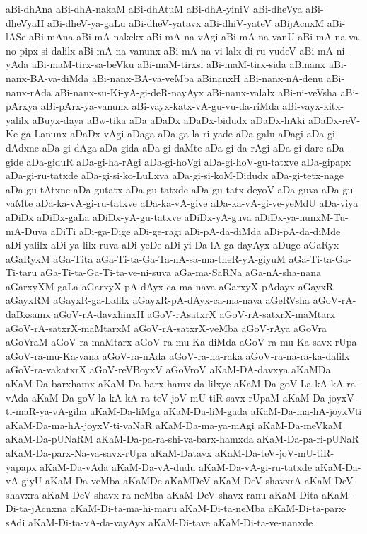 {aBi-dhAna
aBi-dhA-nakaM
aBi-dhAtuM
aBi-dhA-yiniV
aBi-dheVya
aBi-dheVyaH
aBi-dheV-ya-gaLu
aBi-dheV-yatavx
aBi-dhiV-yateV
aBijAcnxM
aBi-lASe
aBi-mAna
aBi-mA-nakekx
aBi-mA-na-vAgi
aBi-mA-na-vanU
aBi-mA-na-va-no-pipx-si-dalilx
aBi-mA-na-vanunx
aBi-mA-na-vi-lalx-di-ru-vudeV
aBi-mA-ni-yAda
aBi-maM-tirx-sa-beVku
aBi-maM-tirxsi
aBi-maM-tirx-sida
aBinanx
aBi-nanx-BA-va-diMda
aBi-nanx-BA-va-veMba
aBinanxH
aBi-nanx-nA-denu
aBi-nanx-rAda
aBi-nanx-su-Ki-yA-gi-deR-nayAyx
aBi-nanx-valalx
aBi-ni-veVsha
aBi-pArxya
aBi-pArx-ya-vanunx
aBi-vayx-katx-vA-gu-vu-da-riMda
aBi-vayx-kitx-yalilx
aBuyx-daya
aBw-tika
aDa
aDaDx
aDaDx-bidudx
aDaDx-hAki
aDaDx-reV-Ke-ga-Lanunx
aDaDx-vAgi
aDaga
aDa-ga-la-ri-yade
aDa-galu
aDagi
aDa-gi-dAdxne
aDa-gi-dAga
aDa-gida
aDa-gi-daMte
aDa-gi-da-rAgi
aDa-gi-dare
aDa-gide
aDa-giduR
aDa-gi-ha-rAgi
aDa-gi-hoVgi
aDa-gi-hoV-gu-tatxve
aDa-gipapx
aDa-gi-ru-tatxde
aDa-gi-si-ko-LuLxva
aDa-gi-si-koM-Didudx
aDa-gi-tetx-nage
aDa-gu-tAtxne
aDa-gutatx
aDa-gu-tatxde
aDa-gu-tatx-deyoV
aDa-guva
aDa-gu-vaMte
aDa-ka-vA-gi-ru-tatxve
aDa-ka-vA-give
aDa-ka-vA-gi-ve-yeMdU
aDa-viya
aDiDx
aDiDx-gaLa
aDiDx-yA-gu-tatxve
aDiDx-yA-guva
aDiDx-ya-nunxM-Tu-mA-Duva
aDiTi
aDi-ga-Dige
aDi-ge-ragi
aDi-pA-da-diMda
aDi-pA-da-diMde
aDi-yalilx
aDi-ya-lilx-ruva
aDi-yeDe
aDi-yi-Da-lA-ga-dayAyx
aDuge
aGaRyx
aGaRyxM
aGa-Tita
aGa-Ti-ta-Ga-Ta-nA-sa-ma-theR-yA-giyuM
aGa-Ti-ta-Ga-Ti-taru
aGa-Ti-ta-Ga-Ti-ta-ve-ni-suva
aGa-ma-SaRNa
aGa-nA-sha-nana
aGarxyXM-gaLa
aGarxyX-pA-dAyx-ca-ma-nava
aGarxyX-pAdayx
aGayxR
aGayxRM
aGayxR-ga-Lalilx
aGayxR-pA-dAyx-ca-ma-nava
aGeRVsha
aGoV-rA-daBxsamx
aGoV-rA-davxhinxH
aGoV-rAsatxrX
aGoV-rA-satxrX-maMtarx
aGoV-rA-satxrX-maMtarxM
aGoV-rA-satxrX-veMba
aGoV-rAya
aGoVra
aGoVraM
aGoV-ra-maMtarx
aGoV-ra-mu-Ka-diMda
aGoV-ra-mu-Ka-savx-rUpa
aGoV-ra-mu-Ka-vana
aGoV-ra-nAda
aGoV-ra-na-raka
aGoV-ra-na-ra-ka-dalilx
aGoV-ra-vakatxrX
aGoV-reVBoyxV
aGoVroV
aKaM-DA-davxya
aKaMDa
aKaM-Da-barxhamx
aKaM-Da-barx-hamx-da-lilxye
aKaM-Da-goV-La-kA-kA-ra-vAda
aKaM-Da-goV-la-kA-kA-ra-teV-joV-mU-tiR-savx-rUpaM
aKaM-Da-joyxV-ti-maR-ya-vA-giha
aKaM-Da-liMga
aKaM-Da-liM-gada
aKaM-Da-ma-hA-joyxVti
aKaM-Da-ma-hA-joyxV-ti-vaNaR
aKaM-Da-ma-ya-mAgi
aKaM-Da-meVkaM
aKaM-Da-pUNaRM
aKaM-Da-pa-ra-shi-va-barx-hamxda
aKaM-Da-pa-ri-pUNaR
aKaM-Da-parx-Na-va-savx-rUpa
aKaM-Datavx
aKaM-Da-teV-joV-mU-tiR-yapapx
aKaM-Da-vAda
aKaM-Da-vA-dudu
aKaM-Da-vA-gi-ru-tatxde
aKaM-Da-vA-giyU
aKaM-Da-veMba
aKaMDe
aKaMDeV
aKaM-DeV-shavxrA
aKaM-DeV-shavxra
aKaM-DeV-shavx-ra-neMba
aKaM-DeV-shavx-ranu
aKaM-Dita
aKaM-Di-ta-jAcnxna
aKaM-Di-ta-ma-hi-maru
aKaM-Di-ta-neMba
aKaM-Di-ta-parx-sAdi
aKaM-Di-ta-vA-da-vayAyx
aKaM-Di-tave
aKaM-Di-ta-ve-nanxde
}
